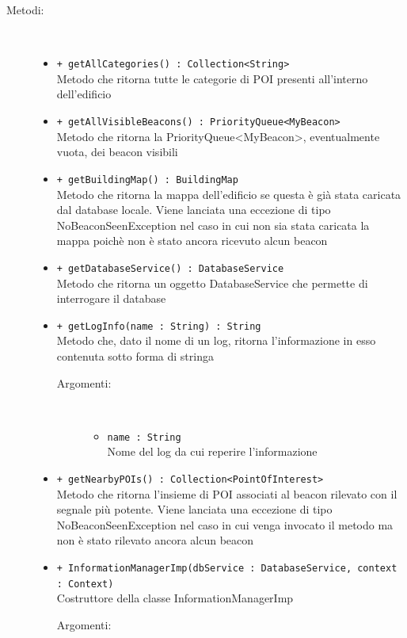 \documentclass[../DefinizioneDiProdotto.tex]{subfiles}
\begin{document}
\begin{description}
\begin{itemize}
\end{itemize}
\item[Metodi:] \
\begin{itemize}
\item \texttt{+ getAllCategories() : Collection<String>}\\
Metodo che ritorna tutte le categorie di POI presenti all'interno dell'edificio
 \item \texttt{+ getAllVisibleBeacons() : PriorityQueue<MyBeacon>}\\
Metodo che ritorna la PriorityQueue<MyBeacon>, eventualmente vuota, dei beacon visibili
 \item \texttt{+ getBuildingMap() : BuildingMap}\\
Metodo che ritorna la mappa dell'edificio se questa è già stata caricata dal database locale. Viene lanciata una eccezione di tipo NoBeaconSeenException nel caso in cui non sia stata caricata la mappa poichè non è stato ancora ricevuto alcun beacon
 \item \texttt{+ getDatabaseService() : DatabaseService}\\
Metodo che ritorna un oggetto DatabaseService che permette di interrogare il database
 \item \texttt{+ getLogInfo(name : String) : String}\\
Metodo che, dato il nome di un log, ritorna l'informazione in esso contenuta sotto forma di stringa
 \begin{description}
\item[Argomenti:] \
\begin{itemize}
\item \texttt{name : String}\\
Nome del log da cui reperire l'informazione\end{itemize}
\end{description}
\item \texttt{+ getNearbyPOIs() : Collection<PointOfInterest>}\\
Metodo che ritorna l'insieme di POI associati al beacon rilevato con il segnale più potente. Viene lanciata una eccezione di tipo NoBeaconSeenException nel caso in cui venga invocato il metodo ma non è stato rilevato ancora alcun beacon
 \item \texttt{+ InformationManagerImp(dbService : DatabaseService, context : Context)}\\
Costruttore della classe InformationManagerImp
 \begin{description}
\item[Argomenti:] \

\end{description}
\end{itemize}
\end{description}
\end{document}
